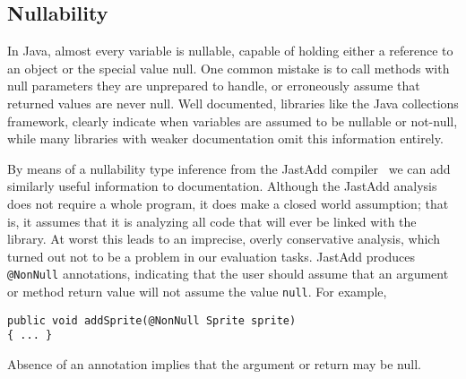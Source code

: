\subsection{Nullability}
\label{sec:Nullability}

In Java, almost every variable is nullable,
capable of holding either a reference to an object or the
special value null.  One common mistake is to call
methods with null parameters they are unprepared to handle, or erroneously
assume that returned values are never null.  Well documented, libraries like
the Java collections framework, clearly indicate when variables are
assumed to be nullable or not-null, while many libraries with weaker
documentation omit this information entirely.

By means of a nullability type inference from the JastAdd compiler~\cite{NonNullTypeInference} we can add
similarly useful information to documentation.  Although the JastAdd analysis
does not require a whole program, it does make a closed
world assumption; that is, it assumes that it is analyzing all code that will ever be
linked with the library.  At worst this leads to an imprecise, overly
conservative analysis, which turned out not to be a problem in our evaluation
tasks.  JastAdd produces \texttt{@NonNull} annotations, indicating that the user
should assume that an
argument or method return value will not assume the value \texttt{null}.  For example,

\begin{verbatim}
public void addSprite(@NonNull Sprite sprite)
{ ... }
\end{verbatim}

Absence of an annotation implies that the argument or return may be null.

